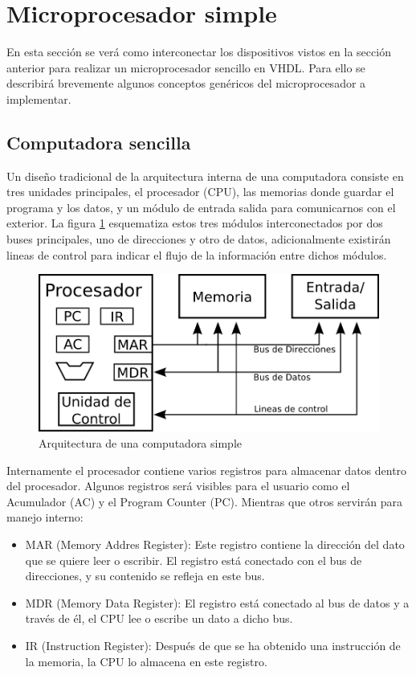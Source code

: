 \section{Microprocesador simple}
En esta sección se verá como interconectar los dispositivos vistos en la sección anterior para
realizar un microprocesador sencillo en VHDL. Para ello se describirá brevemente algunos conceptos
genéricos del microprocesador a implementar.

\subsection{Computadora sencilla}
Un diseño tradicional de la arquitectura interna de una computadora consiste en tres unidades 
principales, el procesador (CPU), las memorias donde guardar el programa y los datos, 
y un módulo de entrada salida para comunicarnos con el exterior.
La figura \ref{arquitectura} esquematiza estos tres módulos interconectados por dos buses
principales, uno de direcciones y otro de datos, adicionalmente existirán lineas de control 
para indicar el flujo de la información entre dichos módulos.

\begin{figure}[h]
  \centering
    \includegraphics[width=.8\textwidth]{graficos/computadora.png}
  \caption{Arquitectura de una computadora simple}
  \label{arquitectura}
\end{figure}

Internamente el procesador contiene varios registros para almacenar datos dentro del
procesador. Algunos registros será visibles para el usuario como el Acumulador (AC) y el 
Program Counter (PC). Mientras que otros servirán para manejo interno:

\begin{itemize}
 \item MAR (Memory Addres Register): Este registro contiene la dirección del dato que se 
 quiere leer o escribir. El registro está conectado con el bus de direcciones, y su contenido se refleja en este bus.
 \item MDR (Memory Data Register): El registro está conectado al bus de datos y a través de él, 
 el CPU lee o escribe un dato a dicho bus.
 \item IR (Instruction Register): Después de que se ha obtenido una instrucción de la memoria, la CPU lo 
 almacena en este registro.
\end{itemize}

